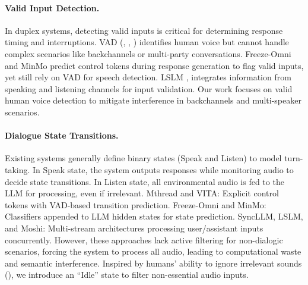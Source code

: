 \paragraph{Valid Input Detection.}
In duplex systems, detecting valid inputs is critical for determining response timing and interruptions. VAD (\citealp{mihalache2022using}, \citealp{deng2013statistical}, \citealp{ramirez2004efficient}) identifies human voice but cannot handle complex scenarios like backchannels or multi-party conversations. Freeze-Omni and MinMo predict control tokens during response generation to flag valid inputs, yet still rely on VAD for speech detection. LSLM \cite{ma2024languagemodellistenspeaking}, integrates information from speaking and listening channels for input validation. Our work focuses on valid human voice detection to mitigate interference in backchannels and multi-speaker scenarios.

\paragraph{Dialogue State Transitions.}
Existing systems generally define binary states (Speak and Listen) to model turn-taking. In Speak state, the system outputs responses while monitoring audio to decide state transitions. In Listen state, all environmental audio is fed to the LLM for processing, even if irrelevant. Mthread and VITA: Explicit control tokens with VAD-based transition prediction. Freeze-Omni and MinMo: Classifiers appended to LLM hidden states for state prediction. SyncLLM, LSLM, and Moshi: Multi-stream architectures processing user/assistant inputs concurrently. However, these approaches lack active filtering for non-dialogic scenarios, forcing the system to process all audio, leading to computational waste and semantic interference. Inspired by humans’ ability to ignore irrelevant sounds (\citealp{shinn2008object}), we introduce an ``Idle'' state to filter non-essential audio inputs.